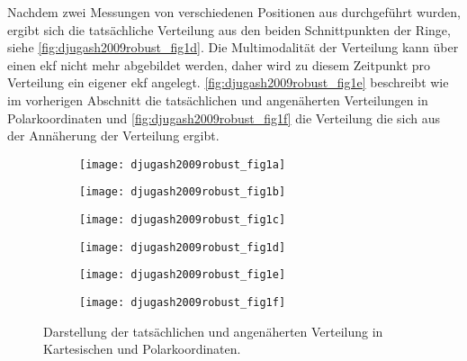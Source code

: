 Nachdem zwei Messungen von verschiedenen Positionen aus durchgeführt wurden, ergibt sich die tatsächliche Verteilung aus den beiden Schnittpunkten der Ringe, siehe \autoref{fig:djugash2009robust_fig1d}. Die Multimodalität der Verteilung kann über einen \Gls{ekf} nicht mehr abgebildet werden, daher wird zu diesem Zeitpunkt pro Verteilung ein eigener \Gls{ekf} angelegt. \autoref{fig:djugash2009robust_fig1e} beschreibt wie im vorherigen Abschnitt die tatsächlichen und angenäherten Verteilungen in Polarkoordinaten und \autoref{fig:djugash2009robust_fig1f} die Verteilung die sich aus der Annäherung der Verteilung ergibt.

\begin{figure}[h]
	\centering
	\begin{subfigure}[b]{0.32\textwidth}
		\centering
		\texttt{[image: djugash2009robust\_fig1a]}
		\caption{}
		\label{fig:djugash2009robust_fig1a}
	\end{subfigure}
	\hfill
	\begin{subfigure}[b]{0.26\textwidth}
		\centering
		\texttt{[image: djugash2009robust\_fig1b]}
		\caption{}
		\label{fig:djugash2009robust_fig1b}
	\end{subfigure}
	\hfill
	\begin{subfigure}[b]{0.32\textwidth}
		\centering
		\texttt{[image: djugash2009robust\_fig1c]}
		\caption{}
		\label{fig:djugash2009robust_fig1c}
	\end{subfigure}
	\bigskip
		\begin{subfigure}[b]{0.32\textwidth}
		\centering
		\texttt{[image: djugash2009robust\_fig1d]}
		\caption{}
		\label{fig:djugash2009robust_fig1d}
	\end{subfigure}
	\hfill
	\begin{subfigure}[b]{0.26\textwidth}
		\centering
		\texttt{[image: djugash2009robust\_fig1e]}
		\caption{}
		\label{fig:djugash2009robust_fig1e}
	\end{subfigure}
	\hfill
	\begin{subfigure}[b]{0.32\textwidth}
		\centering
		\texttt{[image: djugash2009robust\_fig1f]}
		\caption{}
		\label{fig:djugash2009robust_fig1f}
	\end{subfigure}
	\caption{Darstellung der tatsächlichen und angenäherten Verteilung in Kartesischen und Polarkoordinaten.}
	\label{fig:djugash2009robust_fig1}
\end{figure}


